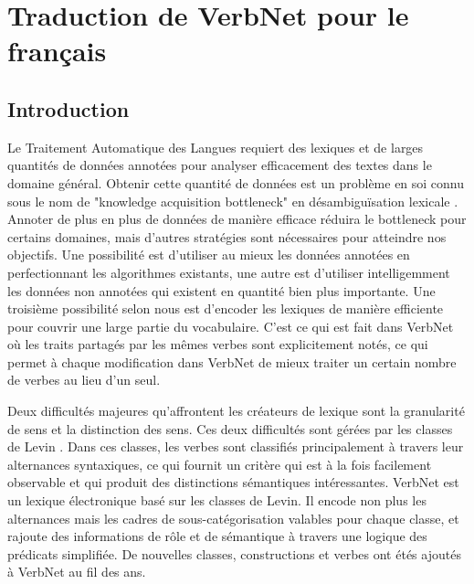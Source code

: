 \chapter{Traduction de VerbNet pour le français}
\label{ch:verbnet}

\section{Introduction}

Le Traitement Automatique des Langues requiert des lexiques et de larges
quantités de données annotées pour analyser efficacement des textes dans le
domaine général. Obtenir cette quantité de données est un problème en soi connu
sous le nom de "knowledge acquisition bottleneck" en désambiguïsation lexicale
\citep{gale1992using}. Annoter de plus en plus de données de manière efficace
réduira le bottleneck pour certains domaines, mais d'autres stratégies sont
nécessaires pour atteindre nos objectifs. Une possibilité est d'utiliser au
mieux les données annotées en perfectionnant les algorithmes existants, une
autre est d'utiliser intelligemment les données non annotées qui existent en
quantité bien plus importante. Une troisième possibilité selon nous est
d'encoder les lexiques de manière efficiente pour couvrir une large partie du
vocabulaire. C'est ce qui est fait dans VerbNet où les traits partagés par les
mêmes verbes sont explicitement notés, ce qui permet à chaque modification dans
VerbNet de mieux traiter un certain nombre de verbes au lieu d'un seul.

Deux difficultés majeures qu'affrontent les créateurs de lexique sont la
granularité de sens et la distinction des sens. Ces deux difficultés sont
gérées par les classes de Levin \citep{levin1993english}. Dans ces classes, les
verbes sont classifiés principalement à travers leur alternances syntaxiques,
ce qui fournit un critère qui est à la fois facilement observable et qui
produit des distinctions sémantiques intéressantes. VerbNet
\citep{kipperschuler2005verbnet} est un lexique électronique basé sur les
classes de Levin. Il encode non plus les alternances mais les cadres de
sous-catégorisation valables pour chaque classe, et rajoute des informations de
rôle et de sémantique à travers une logique des prédicats simplifiée. De
nouvelles classes, constructions et verbes ont étés ajoutés à VerbNet au fil
des ans.

